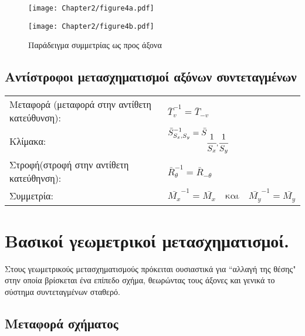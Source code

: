 \begin{figure}[h!]
\begin{center}
\begin{minipage}[b]{0.48\textwidth} %
    \texttt{[image: Chapter2/figure4a.pdf]}
\end{minipage}%
\hfill
\begin{minipage}[b]{0.48\textwidth} %
    \texttt{[image: Chapter2/figure4b.pdf]}
\end{minipage}

\end{center}
  \caption{Παράδειγμα συμμετρίας ως προς άξονα}
\end{figure}

\subsection{ Αντίστροφοι μετασχηματισμοί αξόνων συντεταγμένων}


\begin{tabular}{m{}m{}}
	Μεταφορά (μεταφορά στην αντίθετη κατεύθυνση): & $ \bar{T}_v^{-1} = \bar{T}_{-v} $\\
	Κλίμακα: & $\bar{S}_{S_x, S_y}^{-1} = \bar{S}_{\cfrac{1}{S_x}, \cfrac{1}{S_y}}$\\
	Στροφή(στροφή στην αντίθετη κατεύθηνση):& $ \bar{R}_\theta^{-1} = \bar{R}_{-\theta} $\\
	Συμμετρία: & $\bar{M_x}^{-1} = \bar{M_x} \quad \text{και} \quad \bar{M_y}^{-1} = \bar{M_y}$
\end{tabular}




\section{Βασικοί γεωμετρικοί μετασχηματισμοί.}

Στους γεωμετρικούς μετασχηματισμούς πρόκειται ουσιαστικά για ``αλλαγή της θέσης" στην οποία βρίσκεται ένα επίπεδο σχήμα, θεωρώντας τους άξονες και γενικά το σύστημα συντεταγμένων σταθερό.

\subsection{Μεταφορά σχήματος}

